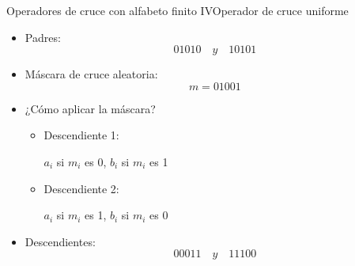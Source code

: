 \documentclass[10pt]{beamer}
\begin{document}
\begin{frame}{Operadores de cruce con alfabeto finito IV}{Operador de cruce uniforme}
			\begin{itemize}
				\item Padres:
				$$ 01010 \quad y \quad 10101 $$
				
				\item Máscara de cruce aleatoria: $$ m = 01001 $$

				\item ¿Cómo aplicar la máscara?
					
					\begin{itemize}
						\item Descendiente 1: \\\begin{center}
							 $a_i$ si $m_i$ es 0, $b_i$ si $m_i$ es 1
						\end{center}
						\item Descendiente 2: \\ \begin{center}$a_i$ si $m_i$ es 1, $b_i$ si $m_i$ es 0	\end{center}
					\end{itemize}
					
							
				\item Descendientes:
				$$ 00011 \quad y \quad 11100 $$
			\end{itemize}
\end{frame}

%			
%			
%
%
%
%			
\end{document}
